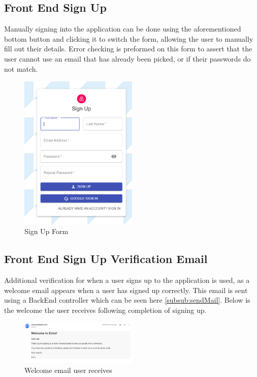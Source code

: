 \subsection{Front End Sign Up}
Manually signing into the application can be done using the aforementioned bottom button and clicking it to switch the form, allowing the user to manually fill out their details. Error checking is preformed on this form to assert that the user cannot use an email that has already been picked, or if their passwords do not match.

\begin{figure}[h!]
    \centering
    \includegraphics[width=0.5\textwidth]{images/SignUp.png}
    \caption{Sign Up Form}
    \label{image:SignUp}
\end{figure}

\newpage
\subsection{Front End Sign Up Verification Email}
Additional verification for when a user signs up to the application is used, as a welcome email appears when a user has signed up correctly. This email is sent using a BackEnd controller which can be seen here \ref{subsub:sendMail}. Below is the welcome the user receives following completion of signing up.
\begin{figure}[h!]
    \centering
    \includegraphics[width=0.5\textwidth]{images/WelcomeEmail.png}
    \caption{Welcome email user receives}
    \label{image:WelcomeEmail}
\end{figure}

